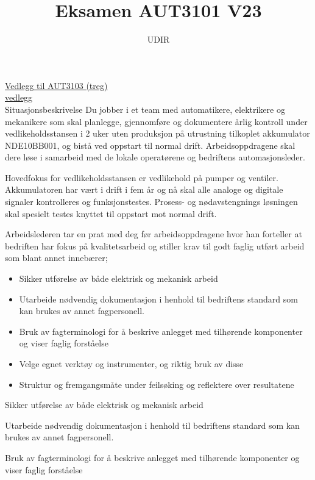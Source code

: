 \documentclass[12pt,a4paper]{article}
\begin{document}
\title{Eksamen AUT3101 V23}
\author{UDIR}
\maketitle
\href{https://sokeresultat.udir.no/eksamenprovemateriell.html?kategori=aut3103&aar=2023-2&spraak=bokm%C3%A5l&trinn=annet&ferdighet=annet}{Vedlegg til AUT3103 (treg)}\\
\href{https://rfka-my.sharepoint.com/:b:/g/personal/fred-olav_mosdal_skole_rogfk_no/EfPLJCqUpSRLqsAt8eUz9gABIPnCilD3gsXV23CZ_eATpQ?e=AQLd6l}{vedlegg}\\
Situasjonsbeskrivelse
\vskip  0.25cm
Du jobber i et team med automatikere, elektrikere og mekanikere som skal planlegge, gjennomføre og dokumentere årlig kontroll under vedlikeholdsstansen i 2 uker uten produksjon på utrustning tilkoplet akkumulator NDE10BB001, og bistå ved oppstart til normal drift. Arbeidsoppdragene skal dere løse i samarbeid med de lokale operatørene og bedriftens automasjonsleder.

\vskip  0.25cm
Hovedfokus for vedlikeholdsstansen er vedlikehold på pumper og ventiler. Akkumulatoren har vært i drift i fem år og nå skal alle analoge og digitale signaler kontrolleres og funksjonstestes. Prosess- og nødavstengnings løsningen skal spesielt testes knyttet til oppstart mot normal drift.

\vskip  0.25cm
Arbeidslederen tar en prat med deg før arbeidsoppdragene hvor han forteller at bedriften har fokus på kvalitetsarbeid og stiller krav til godt faglig utført arbeid som blant annet innebærer;
\begin{itemize}
	\item Sikker utførelse av både elektrisk og mekanisk arbeid
	\item Utarbeide nødvendig dokumentasjon i henhold til bedriftens standard som kan brukes av annet fagpersonell.
	\item Bruk av fagterminologi for å beskrive anlegget med tilhørende komponenter og viser faglig forståelse
	\item Velge egnet verktøy og instrumenter, og riktig bruk av disse
	\item Struktur og fremgangsmåte under feilsøking og reflektere over resultatene
\end{itemize}
Sikker utførelse av både elektrisk og mekanisk arbeid

Utarbeide nødvendig dokumentasjon i henhold til bedriftens standard som kan brukes av annet fagpersonell.

Bruk av fagterminologi for å beskrive anlegget med tilhørende komponenter og viser faglig forståelse
\end{document}
